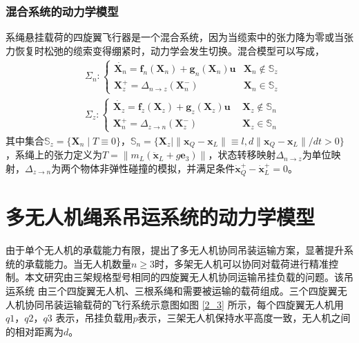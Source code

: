 \documentclass[lang=chs, degree=master, blindreview=false, winfonts=true]{yanputhesis}
\begin{document}
\subsubsection{混合系统的动力学模型}
系绳悬挂载荷的四旋翼飞行器是一个混合系统，因为当缆索中的张力降为零或当张力恢复时松弛的缆索变得绷紧时，动力学会发生切换。混合模型可以写成，
\begin{equation}
	\left.\begin{aligned}&\Sigma_{n}:\left\{\begin{array}{ll}\dot{\bm X_n}=\bm f_n(\bm X_n)+\bm g_n(\bm X_n)\bm u  &\bm X_n\notin \mathbb{S}_z\\\bm X_z^+=\Delta_{n\to z}(\bm X_n^-)  &\bm X_n\in \mathbb{S}_z\end{array}\right.\\&\Sigma_{z}:\left\{\begin{array}{ll}\dot{\bm X_z}=\bm f_z(\bm X_z)+\bm g_z(\bm X_z)\bm u \ \ &\bm X_z\notin \mathbb{S}_n\\\bm X_n^+=\Delta_{z\to n}(\bm X_z^-) \ &\bm X_z\in \mathbb{S}_n\end{array}\right.\end{aligned}\right.
\end{equation}
其中集合$\mathbb S_z = \{ \bm X_n \mid  T \equiv 0 \}$，$\mathbb S_n = \{ \bm X_z \mid \|\bm x_Q - \bm x_L\| \equiv l, d \|\bm x_Q - \bm x_L\| /dt> 0 \}$，系绳上的张力定义为$T = \|m_L (\ddot{\bm x}_L + g\bm{e}_3)\|$，状态转移映射$\Delta_{n\to z}$为单位映射，$\Delta_{z\to n}$为两个物体非弹性碰撞的模拟，并满足条件$\dot{\bm x}_Q^+-\dot{\bm x}_L^+=0$。

\section{多无人机绳系吊运系统的动力学模型}
由于单个无人机的承载能力有限，提出了多无人机协同吊装运输方案，显著提升系统的承载能力。当无人机数量$n\geq3$时，多架无人机可以协同对载荷进行精准控制。本文研究由三架规格型号相同的四旋翼无人机协同运输吊挂负载的问题。该吊运系统
由三个四旋翼无人机、三根系绳和需要被运输的载荷组成。三个四旋翼无人机协同吊装运输载荷的飞行系统示意图如图 \ref{2_3} 所示，每个四旋翼无人机用
$q1$，$q2$，$q3$ 表示，吊挂负载用$p$表示，三架无人机保持水平高度一致，无人机之间的相对距离为$d$。
\end{document}
